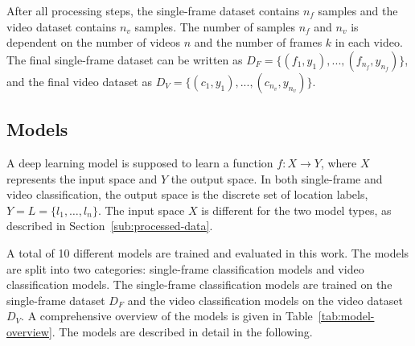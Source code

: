 \documentclass[a4paper]{article}
\begin{document}
  After all processing steps, the single-frame dataset contains $n_f$ samples
  and the video dataset contains $n_v$ samples. The number of samples $n_f$ and
  $n_v$ is dependent on the number of videos $n$ and the number of frames $k$ in
  each video. The final single-frame dataset can be written as $D_F = \{(f_1,
  y_1), ..., (f_{n_f}, y_{n_f})\}$, and the final video dataset as $D_V =
  \{(c_1, y_1), ..., (c_{n_v}, y_{n_v})\}$.




  \subsection{Models} %
  \label{sub:models}

  A deep learning model is supposed to learn a function $f: X \rightarrow Y$,
  where $X$ represents the input space and $Y$ the output space. In both
  single-frame and video classification, the output space is the discrete set of
  location labels, $Y = L = \{l_1, \ldots, l_n\}$. The input space $X$ is
  different for the two model types, as described in
  Section~\ref{sub:processed-data}. 

  A total of 10 different models are trained and evaluated in this work. The
  models are split into two categories: single-frame classification models and
  video classification models. The single-frame classification models are
  trained on the single-frame dataset $D_F$ and the video classification models
  on the video dataset $D_V$. A comprehensive overview of the models is given in
  Table~\ref{tab:model-overview}. The models are described in detail in the
  following.
\end{document}

